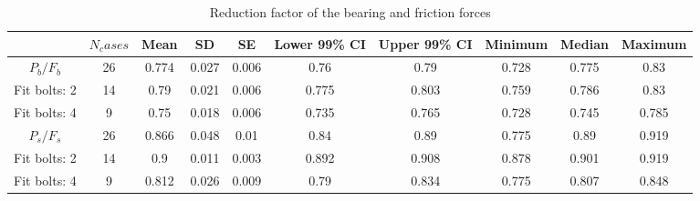 \begin{itemize}
\begin{table*}[]
    \centering
    \caption{Reduction factor of the bearing and friction forces}
    \begin{tabular}{@{}cccccccccc@{}}
    \toprule
     & $N_cases$ & Mean & SD & SE & Lower 99\% CI &Upper 99\% CI & Minimum & Median & Maximum \\ \midrule
     $P_b/F_b$ & 26 & 0.774 & 0.027 & 0.006 & 0.76 & 0.79 & 0.728 & 0.775 & 0.83 \\
     Fit bolts: 2 & 14 & 0.79 & 0.021 & 0.006 & 0.775 & 0.803 & 0.759 & 0.786 & 0.83 \\
     Fit bolts: 4 & 9  & 0.75 & 0.018 & 0.006 & 0.735 & 0.765 & 0.728 & 0.745 & 0.785 \\ \midrule
     $P_s/F_s$ & 26 &0.866 & 0.048 &0.01 &0.84 &0.89 &0.775 &0.89 &0.919 \\
     Fit bolts: 2 & 14 & 0.9 & 0.011 & 0.003 & 0.892 & 0.908 & 0.878 & 0.901 & 0.919 \\
     Fit bolts: 4 & 9  & 0.812 & 0.026 & 0.009 & 0.79 & 0.834 & 0.775 & 0.807 & 0.848 \\
     \bottomrule 
    \end{tabular}
    \label{tab-rdfactor}
\end{table*}







\end{itemize}





